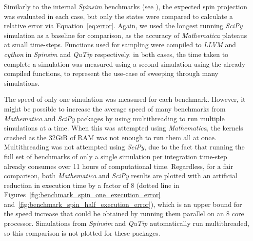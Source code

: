 \documentclass{jors}
\begin{document}
		Similarly to the internal \emph{Spinsim} benchmarks (see \emph{}), the expected spin projection was evaluated in each case, but only the states were compared to calculate a relative error via Equation~\eqref{eq:error}.
		Again, we used the longest running \emph{SciPy} simulation as a baseline for comparison, as the accuracy of \emph{Mathematica} plateaus at small time-steps.
		Functions used for sampling were compiled to \emph{LLVM} and \emph{cython} in \emph{Spinsim} and \emph{QuTip} respectively.
		in both cases, the time taken to complete a simulation was measured using a second simulation using the already compiled functions, to represent the use-case of sweeping through many simulations.

		The speed of only one simulation was measured for each benchmark.
		However, it might be possible to increase the average speed of many benchmarks from \emph{Mathematica} and \emph{SciPy} packages by using multithreading to run multiple simulations at a time.
		When this was attempted using \emph{Mathematica}, the kernels crashed as the 32GiB of RAM was not enough to run them all at once.
		Multithreading was not attempted using \emph{SciPy}, due to the fact that running the full set of benchmarks of only a single simulation per integration time-step already consumes over 11 hours of computational time.
		Regardless, for a fair comparison, both \emph{Mathematica} and \emph{SciPy} results are plotted with an artificial reduction in execution time by a factor of 8 (dotted line in Figures~\ref{fig:benchmark_spin_one_execution_error} and~\ref{fig:benchmark_spin_half_execution_error}), which is an upper bound for the speed increase that could be obtained by running them parallel on an 8 core processor.
		Simulations from \emph{Spinsim} and \emph{QuTip} automatically run multithreaded, so this comparison is not plotted for these packages.
\end{document}
